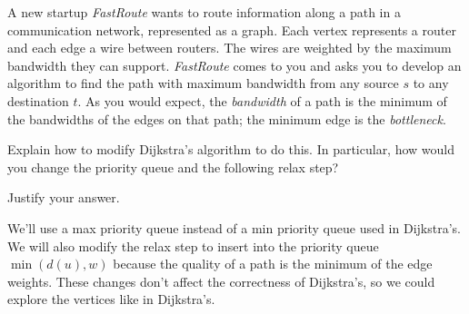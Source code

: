 \begin{cluster}
\label{grp:prb:examii-practice::fall}

\begin{problem}[5]
\label{prb:examii-practice::fall}

A new startup \emph{FastRoute} wants to route information along a path
in a communication network, represented as a graph. Each vertex
represents a router and each edge a wire between routers. The wires
are weighted by the maximum bandwidth they can
support. \emph{FastRoute} comes to you and asks you to develop an
algorithm to find the path with maximum bandwidth from any source $s$
to any destination $t$. As you would expect, the \emph{bandwidth} of a
path is the minimum of the bandwidths of the edges on that path; the
minimum edge is the \emph{bottleneck}.

\ask \label{prt-ask:examii-practice::explain}

Explain how to modify Dijkstra's algorithm to do this. In particular, how would
you change the priority queue and the following relax step?

\begin{quote}
\end{quote}

Justify your answer.


\sol \label{cki-sol:examii-practice::priority}

  We'll use a max priority queue instead of a min priority queue used
  in Dijkstra's. We will also modify the relax step to insert into the
  priority queue $\min(d(u), w)$ because the quality of a path is the
  minimum of the edge weights. These changes don't affect the
  correctness of Dijkstra's, so we could explore the vertices like in
  Dijkstra's.

\end{problem}
\end{cluster}

